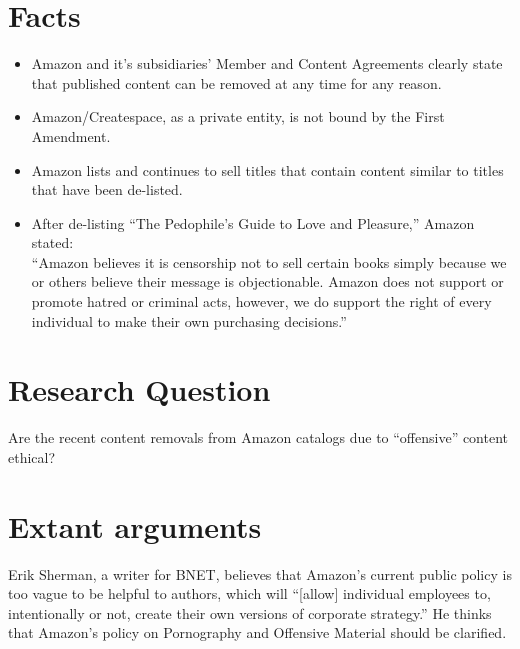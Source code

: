 \documentclass[12pt]{article}
\begin{document}
\section{Facts}
\begin{itemize}
\item Amazon and it's subsidiaries' Member and Content Agreements clearly state that published content can be removed at any time for any reason. \cite{createspaceMemberAgreement} \cite{createspaceContentGuidelines} \cite{AmazonDTPContentGuidelines}

\item Amazon/Createspace, as a private entity, is not bound by the First Amendment.

\item Amazon lists and continues to sell titles that contain content similar to titles that have been de-listed. \cite{AmazonLolitaDTPListing}

\item After de-listing ``The Pedophile's Guide to Love and Pleasure,'' Amazon stated: \\
      ``Amazon believes it is censorship not to sell certain books simply because we or others believe their message is objectionable.  Amazon does not support or promote hatred or criminal acts, however, we do support the right of every individual to make their own purchasing decisions.'' \cite{TechCrunchAmazonCensorship}

\end{itemize}

\section{Research Question}
Are the recent content removals from Amazon catalogs due to ``offensive'' content ethical?

\section{Extant arguments}
Erik Sherman, a writer for BNET, believes that Amazon's current public policy is too vague to be helpful to authors, which will ``[allow] individual employees to, intentionally or not, create their own versions of corporate strategy.'' He thinks that Amazon's policy on Pornography and Offensive Material should be clarified. \cite{ShermanAmazonExecs}
\end{document}
